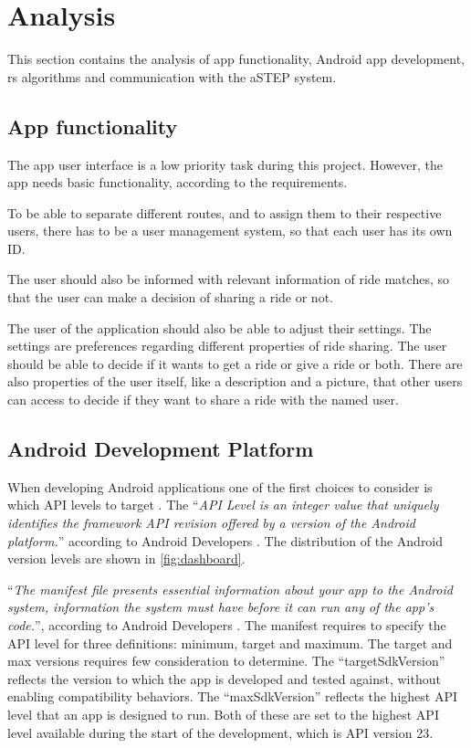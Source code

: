 \section{Analysis}
This section contains the analysis of app functionality, Android app development, \gls{rs} algorithms and communication with the aSTEP system.

\subsection{App functionality}
The app user interface is a low priority task during this project.
However, the app needs basic functionality, according to the requirements.

To be able to separate different routes, and to assign them to their respective users, there has to be a user management system, so that each user has its own ID.

The user should also be informed with relevant information of ride matches, so that the user can make a decision of sharing a ride or not.

The user of the application should also be able to adjust their settings.
The settings are preferences regarding different properties of ride sharing.
The user should be able to decide if it wants to get a ride or give a ride or both.
There are also properties of the user itself, like a description and a picture, that other users can access to decide if they want to share a ride with the named user.






\subsection{Android Development Platform}
When developing Android applications one of the first choices to consider is which API levels to target \cite{usesSDK}.
The ``\textit{API Level is an integer value that uniquely identifies the framework API revision offered by a version of the Android platform.}'' according to Android Developers \cite{usesSDK}.
The distribution of the Android version levels are shown in \ref{fig:dashboard}.

``\textit{The manifest file presents essential information about your app to the Android system, information the system must have before it can run any of the app's code.}'', according to Android Developers \cite{androidManifest}.
The manifest requires to specify the API level for three definitions: minimum, target and maximum. 
The target and max versions requires few consideration to determine.
The ``targetSdkVersion'' reflects the version to which the app is developed and tested against, without enabling compatibility behaviors.
The ``maxSdkVersion'' reflects the highest API level that an app is designed to run.
Both of these are set to the highest API level available during the start of the development, which is API version 23.

